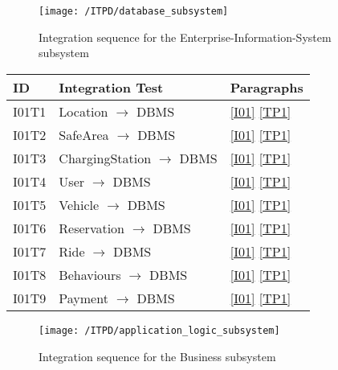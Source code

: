 	\begin{figure}[!ht]
	  \centering
	  \vspace{0.2cm}
	  \texttt{[image: /ITPD/database\_subsystem]}\\
	  \vspace{0.2cm}
	  \caption{Integration sequence for the Enterprise-Information-System subsystem} 
	  \label{fig:database_integration} 
	\end{figure}

	\begin{center}
		\vspace{0.6cm}
		\begin{tabular}{|l|l|l|}
			\hline
			\textbf{ID} & \textbf{Integration Test} & \textbf{Paragraphs} \bigstrut \\\hline
			\hline
			I01T1 & Location \ensuremath{\rightarrow} DBMS & \ref{I01}  \ref{TP1} \bigstrut \\\hline
			I01T2 & SafeArea \ensuremath{\rightarrow} DBMS & \ref{I01}  \ref{TP1} \bigstrut \\\hline
			I01T3 & ChargingStation \ensuremath{\rightarrow} DBMS & \ref{I01}  \ref{TP1} \bigstrut \\\hline
			I01T4 & User \ensuremath{\rightarrow} DBMS & \ref{I01}  \ref{TP1} \bigstrut \\\hline
			I01T5 & Vehicle \ensuremath{\rightarrow} DBMS & \ref{I01}  \ref{TP1} \bigstrut \\\hline
			I01T6 & Reservation \ensuremath{\rightarrow} DBMS & \ref{I01}  \ref{TP1} \bigstrut \\\hline
			I01T7 & Ride \ensuremath{\rightarrow} DBMS & \ref{I01}  \ref{TP1} \bigstrut \\\hline
			I01T8 & Behaviours \ensuremath{\rightarrow} DBMS & \ref{I01}  \ref{TP1} \bigstrut \\\hline
			I01T9 & Payment \ensuremath{\rightarrow} DBMS & \ref{I01}  \ref{TP1} \bigstrut \\\hline
		\end{tabular}
	\end{center}

	\newpage
	\begin{figure}[!ht]
	  \centering
	  \vspace{0.2cm}
	  \texttt{[image: /ITPD/application\_logic\_subsystem]}\\
	  \vspace{0.2cm}
	  \caption{Integration sequence for the Business subsystem} 
	  \label{fig:application_logic_subsystem} 
	\end{figure}

